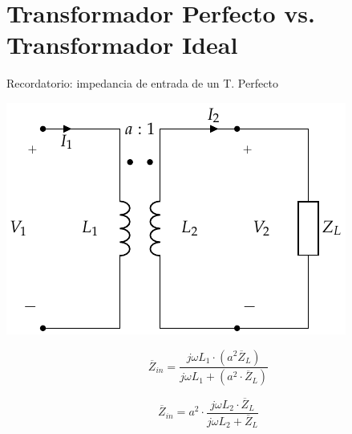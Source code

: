 \documentclass[xcolor={usenames,svgnames,dvipsnames}]{beamer}
\begin{document}
\section{Transformador Perfecto vs. Transformador Ideal}
\label{sec:orgfc0e37d}
\begin{frame}[label={sec:orgad0c699}]{Recordatorio: impedancia de entrada de un T. Perfecto}
\begin{center}
\includegraphics[height=0.45\textheight]{../figs/TrafoPerfecto_ImpedanciaSecundario.pdf}
\end{center}

\[
  \boxed{\overline{Z}_{in} = \frac{j \omega L_1 \cdot (a^2 \overline{Z}_L)}{j\omega L_1 + (a^2 \cdot \overline{Z}_L)}}
\]

\[
  \boxed{\overline{Z}_{in} = a^2 \cdot \frac{j \omega L_2 \cdot \overline{Z}_L}{j\omega L_2 + \overline{Z}_L}}
\]
\end{frame}
\end{document}
